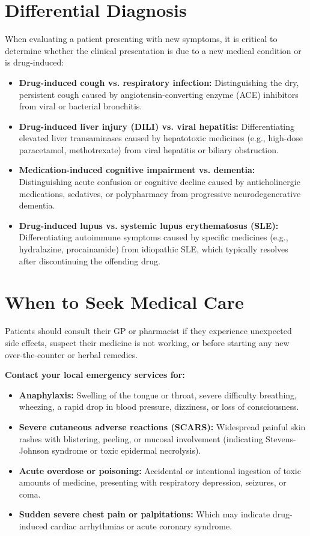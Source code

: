\section*{Differential Diagnosis}
When evaluating a patient presenting with new symptoms, it is critical to determine whether the clinical presentation is due to a new medical condition or is drug-induced:
\begin{itemize}
    \item \textbf{Drug-induced cough vs. respiratory infection:} Distinguishing the dry, persistent cough caused by angiotensin-converting enzyme (ACE) inhibitors from viral or bacterial bronchitis.
    \item \textbf{Drug-induced liver injury (DILI) vs. viral hepatitis:} Differentiating elevated liver transaminases caused by hepatotoxic medicines (e.g., high-dose paracetamol, methotrexate) from viral hepatitis or biliary obstruction.
    \item \textbf{Medication-induced cognitive impairment vs. dementia:} Distinguishing acute confusion or cognitive decline caused by anticholinergic medications, sedatives, or polypharmacy from progressive neurodegenerative dementia.
    \item \textbf{Drug-induced lupus vs. systemic lupus erythematosus (SLE):} Differentiating autoimmune symptoms caused by specific medicines (e.g., hydralazine, procainamide) from idiopathic SLE, which typically resolves after discontinuing the offending drug.
\end{itemize}

\section*{When to Seek Medical Care}
Patients should consult their GP or pharmacist if they experience unexpected side effects, suspect their medicine is not working, or before starting any new over-the-counter or herbal remedies.

\textbf{Contact your local emergency services for:}
\begin{itemize}
    \item \textbf{Anaphylaxis:} Swelling of the tongue or throat, severe difficulty breathing, wheezing, a rapid drop in blood pressure, dizziness, or loss of consciousness.
    \item \textbf{Severe cutaneous adverse reactions (SCARS):} Widespread painful skin rashes with blistering, peeling, or mucosal involvement (indicating Stevens-Johnson syndrome or toxic epidermal necrolysis).
    \item \textbf{Acute overdose or poisoning:} Accidental or intentional ingestion of toxic amounts of medicine, presenting with respiratory depression, seizures, or coma.
    \item \textbf{Sudden severe chest pain or palpitations:} Which may indicate drug-induced cardiac arrhythmias or acute coronary syndrome.
\end{itemize}

